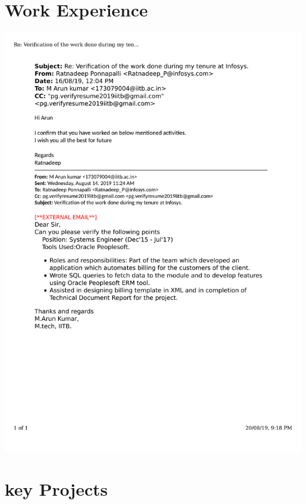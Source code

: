 \documentclass{article}
\begin{document}
\section{Work Experience}
	\includegraphics[page=1, scale=0.5]{proofs/workex.pdf}\\
\section{key Projects}
\end{document}
